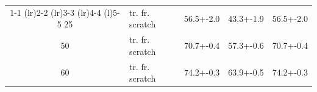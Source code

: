 \begin{table}[]
\begin{tabularx}{0.75\linewidth}{clccc}
\cmidrule(r){1-1} \cmidrule(lr){2-2} \cmidrule(lr){3-3} \cmidrule(lr){4-4} \cmidrule(l){5-5} 
25 & tr. fr. scratch                  & 56.5+-2.0                        & 43.3+-1.9                            & 56.5+-2.0                             \\
50 & tr. fr. scratch                  & 70.7+-0.4                        & 57.3+-0.6                            & 70.7+-0.4                             \\
60 & tr. fr. scratch                  & 74.2+-0.3                        & 63.9+-0.5                            & 74.2+-0.3                         \\
\bottomrule
\end{tabularx}
\label{tab:generative_resnets_zoos_transfer}
\end{table}





